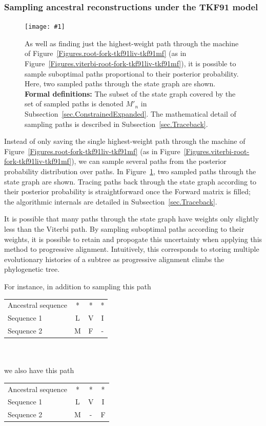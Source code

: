 \documentclass{article}
\newcommand{\secref}[1]{Subsection~\ref{sec.#1}}
\newcommand{\figref}[1]{Figure~\ref{Figures.#1}}
\newcommand{\figlabel}[1]{\label{Figures.#1}}
\newcommand{\easyfig}[4]{
\begin{figure}
\texttt{[image: \#1]}
\caption{ \figlabel{#3} #4}
\end{figure}}
\newcommand{\widepngfig}[2]{\easyfig{#1.png}{width=\textwidth}{#1}{#2}}
\newcommand\formaldefs{{\bf Formal definitions: }}
\begin{document}
\subsubsection{Sampling ancestral reconstructions under the TKF91 model}

\widepngfig{forward2-root-fork-tkf91liv-tkf91mf}{
As well as finding just the highest-weight path through
the machine of \figref{root-fork-tkf91liv-tkf91mf}
(as in \figref{viterbi-root-fork-tkf91liv-tkf91mf}),
it is possible to sample suboptimal paths proportional to their posterior probability.  
Here, two sampled paths through the state graph are shown. 
\formaldefs
The subset of the state graph covered by the set of sampled paths is denoted $M'_n$ in \secref{ConstrainedExpanded}.
The mathematical detail of sampling paths is described in \secref{Traceback}.}

Instead of only saving the single highest-weight path through
the machine of \figref{root-fork-tkf91liv-tkf91mf}
(as in \figref{viterbi-root-fork-tkf91liv-tkf91mf}),
we can sample several paths from the posterior probability distribution over paths.  
In \figref{forward2-root-fork-tkf91liv-tkf91mf}, two sampled paths through the 
state graph are shown.  
Tracing paths back through the state graph according to their posterior probability
is straightforward once the Forward matrix is filled; 
the algorithmic internals are detailed in \secref{Traceback}. 


It is possible that many paths through the state graph have weights only slightly less than the 
Viterbi path.
By sampling suboptimal paths according to their weights, it is possible to retain and 
propogate  this uncertainty when applying this method to progressive alignment. 
Intuitively, this corresponds to storing multiple evolutionary histories of a subtree
as  progressive alignment climbs the phylogenetic tree.  

\noindent For instance, in addition to sampling this path

\begin{tabular}{lccc}
Ancestral sequence & * & * & * \\
Sequence 1         & L & V & I \\
Sequence 2         & M & F & -
\end{tabular}
\\ \\ 
we also have this path

\begin{tabular}{lccc}
Ancestral sequence & * & * & * \\
Sequence 1         & L & V & I \\
Sequence 2         & M & - & F
\end{tabular}
\end{document}
